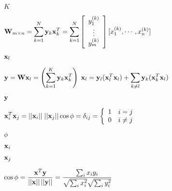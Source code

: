 \documentclass{article}
\def\lthtmlcheckvsize{\ifdim\ht\sizebox<\vsize 
  \ifdim\wd\sizebox<\hsize\expandafter\hfill\fi \expandafter\vfill
  \else\expandafter\vss\fi}%
\begin{document}
{\newpage\clearpage
{}%
$ K$%
\lthtmlindisplaymathZ
\lthtmlcheckvsize\clearpage}

{\newpage\clearpage
{}%
$\displaystyle {\bf W}_{m\times n}=\sum_{k=1}^N {\bf y}_k {\bf x}_k^T = \sum_{k=1}^N
\left[ \begin{array}{c} y_1^{(k)} \\\vdots \\y_m^{(k)} \end{array} \right]
[ x_1^{(k)}, \cdots, x_n^{(k)} ]$%
\lthtmlindisplaymathZ
\lthtmlcheckvsize\clearpage}

{\newpage\clearpage
{}%
$ {\bf x}_l$%
\lthtmlindisplaymathZ
\lthtmlcheckvsize\clearpage}

{\newpage\clearpage
{}%
$\displaystyle {\bf y}={\bf W}{\bf x}_l=\left(\sum_{k=1}^K {\bf y}_k {\bf x}_k^T\right)\;{\bf x}_l
={\bf y}_l({\bf x}_l^T{\bf x}_l)+\sum_{k\neq l}{\bf y}_k({\bf x}_k^T{\bf x}_l)$%
\lthtmlindisplaymathZ
\lthtmlcheckvsize\clearpage}

{\newpage\clearpage
{}%
$ {\bf y}$%
\lthtmlindisplaymathZ
\lthtmlcheckvsize\clearpage}

{\newpage\clearpage
{}%
$\displaystyle {\bf x}_i^T{\bf x}_j=||{\bf x}_i||\;||{\bf x}_j|| \cos \phi
= \delta_{ij}=\left\{ \begin{array}{ll} 1 & i=j \\0 & i\ne j \end{array}
\right.$%
\lthtmlindisplaymathZ
\lthtmlcheckvsize\clearpage}

{\newpage\clearpage
{}%
$ \phi$%
\lthtmlindisplaymathZ
\lthtmlcheckvsize\clearpage}

{\newpage\clearpage
{}%
$ {\bf x}_i$%
\lthtmlindisplaymathZ
\lthtmlcheckvsize\clearpage}

{\newpage\clearpage
{}%
$ {\bf x}_j$%
\lthtmlindisplaymathZ
\lthtmlcheckvsize\clearpage}

{\newpage\clearpage
{}%
$\displaystyle \cos\phi = \frac{{\bf x}^T{\bf y}}{||{\bf x}||\,||{\bf y}||}
=\frac{\sum_i x_i y_i}{\sqrt{\sum_i x_i^2}\sqrt{\sum_i y_i^2} }$%
\lthtmlindisplaymathZ
\lthtmlcheckvsize\clearpage}
\end{document}
